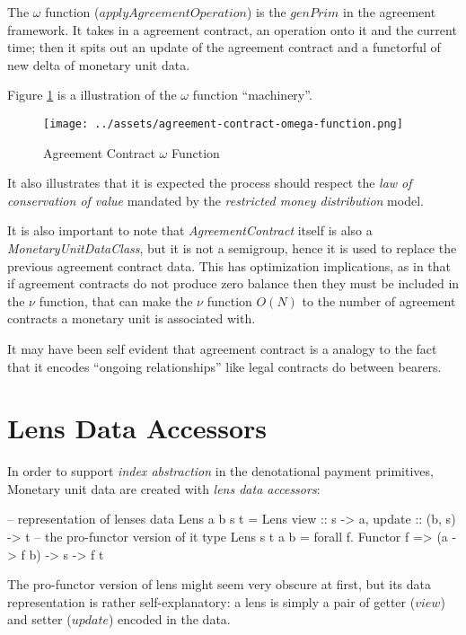 The $\omega$ function ($applyAgreementOperation$) is the $genPrim$ in the agreement framework. It
takes in a agreement contract, an operation onto it and the current time; then it spits out an
update of the agreement contract and a functorful of new delta of monetary unit data.

Figure \ref{fig:ac-omega} is a illustration of the $\omega$ function ``machinery''.

\begin{figure}[H]
    \centering
    \texttt{[image: ../assets/agreement-contract-omega-function.png]}
    \caption{Agreement Contract $\omega$ Function}
    \label{fig:ac-omega}
\end{figure}

It also illustrates that it is expected the process should respect the \textit{law of conservation
of value} mandated by the \textit{restricted money distribution} model.

It is also important to note that \textit{AgreementContract} itself is also
a \textit{MonetaryUnitDataClass}, but it is not a semigroup, hence it is used to replace the
previous agreement contract data. This has optimization implications, as in that if agreement
contracts do not produce zero balance then they must be included in the $\nu$ function, that can
make the $\nu$ function $O(N)$ to the number of agreement contracts a monetary unit is
associated with.

It may have been self evident that agreement contract is a analogy to the fact that it encodes
``ongoing relationships'' like legal contracts do between bearers.

\section{Lens Data Accessors}

In order to support \textit{index abstraction} in the denotational payment primitives, Monetary unit
data are created with \textit{lens data accessors}:

\begin{code}
-- representation of lenses
data Lens a b s t = Lens { view :: s -> a, update :: (b, s) -> t }
-- the pro-functor version of it
type Lens s t a b = forall f. Functor f => (a -> f b) -> s -> f t
\end{code}

The pro-functor version of lens might seem very obscure at first, but its data representation is
rather self-explanatory: a lens is simply a pair of getter ($view$) and setter ($update$) encoded in
the data.

